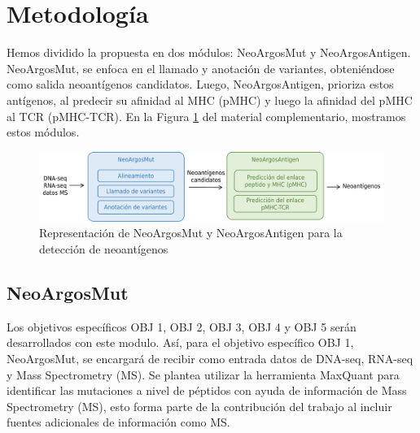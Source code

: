 \documentclass[a4paper,11pt]{article}
\begin{document}

\section{Metodología} 


Hemos dividido la propuesta en dos módulos: NeoArgosMut y NeoArgosAntigen. NeoArgosMut, se enfoca en el llamado y anotación de variantes, obteniéndose como salida neoantígenos candidatos. Luego, NeoArgosAntigen, prioriza estos antígenos, al predecir su afinidad al MHC (pMHC) y luego la afinidad del pMHC al TCR (pMHC-TCR). En la Figura \ref{fig:pipeline} del material complementario, mostramos estos módulos. 



\begin{figure}[h]	
		\centering
		\includegraphics[width=\textwidth]{../img/pipeline/proposal_pipeline}	
	\caption{Representación de NeoArgosMut y NeoArgosAntigen para la detección de neoantígenos}
	\label{fig:pipeline}
\end{figure}


\subsection{NeoArgosMut}

Los objetivos específicos OBJ 1, OBJ  2, OBJ 3, OBJ 4 y OBJ 5 serán desarrollados con este modulo. Así, para el objetivo específico OBJ 1, NeoArgosMut, se encargará de recibir como entrada datos de DNA-seq, RNA-seq y Mass Spectrometry (MS). Se plantea utilizar la herramienta MaxQuant \cite{prianichnikov2020maxquant} para identificar las mutaciones a nivel de péptidos con ayuda de información de Mass Spectrometry (MS), esto  forma parte de la contribución del trabajo al incluir fuentes adicionales de información como MS.
\end{document}
